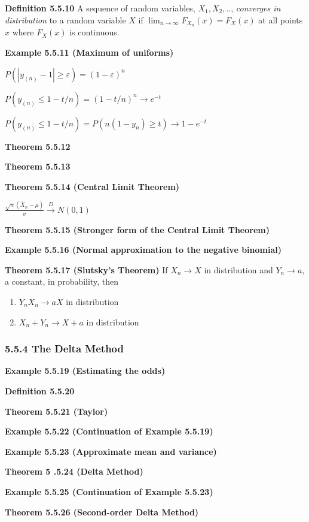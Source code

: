 \documentclass[10pt,twocolumn,portrait]{article}
\providecommand{\tightlist}{%
  \setlength{\itemsep}{0pt}\setlength{\parskip}{0pt}}
\begin{document}
\textbf{Definition 5.5.10} A sequence of random variables,
\(X_1,X_2,..\), \emph{converges in distribution} to a random variable
\(X\) if \(\lim_{n\to\infty}F_{X_n}(x)=F_X(x)\) at all points \(x\)
where \(F_X(x)\) is continuous.

\textbf{Example 5.5.11 (Maximum of uniforms)}

\(P(|y_{(n)}-1|\ge\varepsilon)=(1-\varepsilon)^n\)

\(P(y_{(n)}\le1-t/n)=(1-t/n)^n\to e^{-t}\)

\(P(y_{(n)}\le1-t/n)=P(n(1-y_n)\ge t)\to 1-e^{-t}\)

\textbf{Theorem 5.5.12}

\textbf{Theorem 5.5.13}

\textbf{Theorem 5.5.14 (Central Limit Theorem)}

\(\frac{\sqrt n(\bar X_n-\mu)}{\sigma}\overset{D}{\to}N(0,1)\)

\textbf{Theorem 5.5.15 (Stronger form of the Central Limit Theorem)}

\textbf{Example 5.5.16 (Normal approximation to the negative binomial)}

\textbf{Theorem 5.5.17 (Slutsky's Theorem)} If \(X_n\to X\) in
distribution and \(Y_n\to a\), a constant, in probability, then

\begin{enumerate}
\def\labelenumi{\alph{enumi}.}
\tightlist
\item
  \(Y_nX_n\to aX\) in distribution
\item
  \(X_n+Y_n\to X+a\) in distribution
\end{enumerate}

\hypertarget{DeltaM}{%
\subsubsection{5.5.4 The Delta Method}\label{DeltaM}}

\textbf{Example 5.5.19 (Estimating the odds)}

\textbf{Definition 5.5.20}

\textbf{Theorem 5.5.21 (Taylor)}

\textbf{Example 5.5.22 (Continuation of Example 5.5.19)}

\textbf{Example 5.5.23 (Approximate mean and variance)}

\textbf{Theorem 5 .5.24 (Delta Method)}

\textbf{Example 5.5.25 (Continuation of Example 5.5.23)}

\textbf{Theorem 5.5.26 (Second-order Delta Method)}
\end{document}
